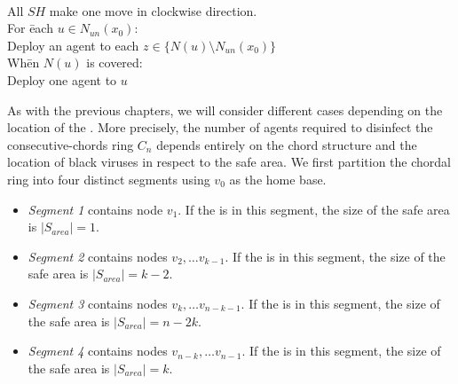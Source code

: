 \begin{center}
{\begin{minipage}{8.5cm}
\begin{tabbing}
   \\
 All $SH$ make one move in  clockwise direction.\\ %
 For \= each $u \in   N_{un}(x_0)$:\\
\>  {\sc Deploy}  an  agent   to each  $z\in \{N(u)\setminus  N_{un}(x_0)\}$\\

  Wh\=en $N(u)$ is covered:\\
 \> {\sc Deploy} one agent to   $u$
  \end{tabbing}
\end{minipage}
}
\end{center}


%

As with the previous chapters, we will consider different cases depending on the location of the \bv.
More precisely, the number of agents required to disinfect the consecutive-chords ring $C_n$ depends entirely on the chord structure and the location of black viruses in respect to the safe area. We first  partition the chordal ring into four distinct segments using $v_0$ as the home base.

\begin{itemize}
\item {\em Segment 1} contains node $v_1$.  
If the \bv is in this segment, the size of the safe area is $|S_{area}| =1$.
\item {\em  Segment 2} contains nodes $v_2, \ldots v_{k-1}$.   If the \bv is in this segment, the size of the safe area is $|S_{area}| =k-2$.
\item {\em   Segment 3} contains nodes $v_k, \ldots v_{n-k-1}$.   If the \bv is in this segment, the size of the safe area is $|S_{area}| =n-2k$.
\item {\em Segment 4}  contains nodes $v_{n-k}, \ldots v_{n-1}$.   If the \bv is in this segment, the size of the safe area is $|S_{area}| =k$.
\end{itemize}

 

